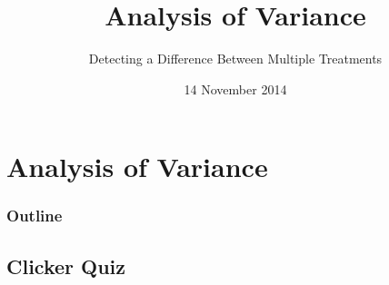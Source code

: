 \section{Analysis of Variance}

\title{Analysis of Variance}
\subtitle{Detecting a Difference Between Multiple Treatments}

\date{14 November 2014}

\begin{frame}
  \titlepage
\end{frame}

\begin{frame}
  \frametitle{Outline}
  \tableofcontents[hideothersubsections,sectionstyle=show/hide]
\end{frame}



\subsection{Clicker Quiz}

